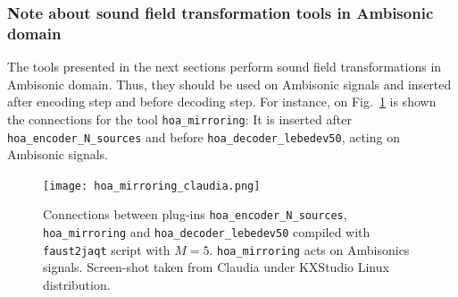 \documentclass[10pt,a4paper]{article}
\begin{document}
\subsubsection{Note about sound field transformation tools in Ambisonic domain}
The tools presented in the next sections perform sound field transformations in Ambisonic domain. Thus, they should be used on Ambisonic signals and inserted after encoding step and before decoding step. For instance, on Fig.~\ref{fig:hoa_mirroring_claudia} is shown the connections for the tool \lstinline'hoa_mirroring': It is inserted after \lstinline'hoa_encoder_N_sources' and before \lstinline'hoa_decoder_lebedev50', acting on Ambisonic signals.
\begin{figure}[!ht]
\centering
\texttt{[image: hoa\_mirroring\_claudia.png]}
\caption{Connections between plug-ins \lstinline'hoa_encoder_N_sources',  \lstinline'hoa_mirroring' and \lstinline'hoa_decoder_lebedev50' compiled with \lstinline'faust2jaqt' script with $M=5$. \lstinline'hoa_mirroring' acts on Ambisonics signals. Screen-shot taken from Claudia under KXStudio Linux distribution.}
\label{fig:hoa_mirroring_claudia}
\end{figure}

\pagebreak
\end{document}
